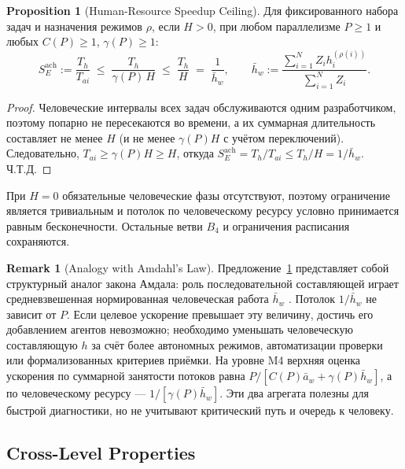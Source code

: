 \documentclass[12pt,a4paper]{article}
\theoremstyle{definition}
\newtheorem{proposition}{Proposition}
\newtheorem{remark}{Remark}
\begin{document}
\begin{proposition}[Human-Resource Speedup Ceiling]\label{prop:amdahl}
Для фиксированного набора задач и назначения режимов $\rho$, если $H>0$, при любом параллелизме $P \ge 1$ и любых $C(P) \ge 1$, $\gamma(P) \ge 1$:
\[
  S_E^{\mathrm{ach}}:=\frac{T_h}{T_{ai}}
  \;\le\; \frac{T_h}{\gamma(P)\,H} \;\le\; \frac{T_h}{H} \;=\; \frac{1}{\bar{h}_w},
  \qquad
  \bar{h}_w := \frac{\sum_{i=1}^{N} Z_i h_i^{(\rho(i))}}{\sum_{i=1}^{N} Z_i}.
\]
\end{proposition}

\begin{proof}
Человеческие интервалы всех задач обслуживаются одним разработчиком, поэтому попарно не пересекаются во времени, а их суммарная длительность составляет не менее $H$ (и не менее $\gamma(P) H$ с учётом переключений). Следовательно, $T_{ai} \ge \gamma(P) H \ge H$, откуда $S_E^{\mathrm{ach}} = T_h / T_{ai} \le T_h / H = 1/\bar{h}_w$. Ч.Т.Д.
\end{proof}

При $H=0$ обязательные человеческие фазы отсутствуют, поэтому ограничение
является тривиальным и потолок по человеческому ресурсу условно принимается
равным бесконечности. Остальные ветви $B_4$ и ограничения расписания сохраняются.

\begin{remark}[Analogy with Amdahl's Law]\label{rem:amdahl-analogy}
Предложение~\ref{prop:amdahl} представляет собой структурный аналог закона Амдала: роль последовательной составляющей играет средневзвешенная нормированная человеческая работа $\bar{h}_w$ \cite{amdahl1967validity}. Потолок $1/\bar{h}_w$ не зависит от $P$. Если целевое ускорение превышает эту величину, достичь его добавлением агентов невозможно; необходимо уменьшать человеческую составляющую $h$ за счёт более автономных режимов, автоматизации проверки или формализованных критериев приёмки. На уровне M4 верхняя оценка ускорения по суммарной занятости потоков равна $P/[C(P)\bar a_w+\gamma(P)\bar h_w]$, а по человеческому ресурсу --- $1/[\gamma(P)\bar h_w]$. Эти два агрегата полезны для быстрой диагностики, но не учитывают критический путь и очередь к человеку.
\end{remark}

\subsection{Cross-Level Properties}
\end{document}
